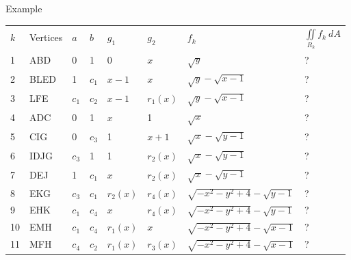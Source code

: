 \documentclass[a4paper,10pt]{article}
\begin{document}
\begin{section}{Example}
\begin{table}
\begin{center}
\begin{tabular}{|l l l l l l l l|}
  $k$ & Vertices & $a$ & $b$  & $g_1$ & $g_2$ & $f_k$ & $\iint\limits_{\!R_k} f_k~dA$\\
  1 & ABD & 0 & 1& 0 & $x$ & $\sqrt{y}$ & ?\\
  2 & BLED& 1& $c_1$ & $x-1$ & $x$ & $\sqrt{y} - \sqrt{x-1}$& ?\\
  3 & LFE& $c_1$ & $c_2$ & $x-1$ & $r_1(x)$&$\sqrt{y} - \sqrt{x-1}$&?\\
  4 & ADC& 0 & 1 & $x$ & 1 & $\sqrt{x}$ & ?\\
  5 & CIG& 0 & $c_3$ & 1 & $x+1$ & $\sqrt{x} - \sqrt{y-1}$ & ? \\
  6 & IDJG& $c_3$ & 1 & 1 & $r_2(x)$ & $\sqrt{x} - \sqrt{y-1}$&?\\
  7 & DEJ& 1& $c_1$& $x$ & $r_2(x)$ & $\sqrt{x} - \sqrt{y-1}$&? \\ 
  8 & EKG& $c_3$& $c_1$& $r_2(x)$ & $r_4(x)$ & $\sqrt{-x^2-y^2+4}-\sqrt{y-1}$&?\\ 
  9 & EHK& $c_1$& $c_4$& $x$& $r_4(x)$ & $\sqrt{-x^2-y^2+4}-\sqrt{y-1}$&?\\
  10& EMH& $c_1$& $c_4$& $r_1(x)$& $x$ & $\sqrt{-x^2-y^2+4}-\sqrt{x-1}$&?\\
  11& MFH& $c_4$& $c_2$& $r_1(x)$& $r_3(x)$ & $\sqrt{-x^2-y^2+4}-\sqrt{x-1}$&?\\ 
\end{tabular}
 
\end{center}

\end{table}


 
\end{section}
\end{document}
